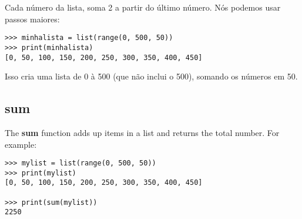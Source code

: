 \noindent
Cada número da lista, soma 2 a partir do último número. Nós podemos usar passos maiores:

\begin{listing}
\begin{verbatim}
>>> minhalista = list(range(0, 500, 50))
>>> print(minhalista)
[0, 50, 100, 150, 200, 250, 300, 350, 400, 450]
\end{verbatim}
\end{listing}

Isso cria uma lista de 0 à 500 (que não inclui o 500), somando os números em 50.

\subsection*{sum}

The \textbf{sum} function adds up items in a list and returns the total number. For example:

\begin{listing}
\begin{verbatim}
>>> mylist = list(range(0, 500, 50))
>>> print(mylist)
[0, 50, 100, 150, 200, 250, 300, 350, 400, 450]

>>> print(sum(mylist))
2250
\end{verbatim}
\end{listing}

\newpage
